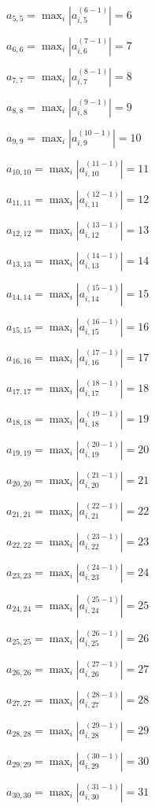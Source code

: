 \documentclass[a4paper,12pt]{article}
\begin{document}
$a _{ 5, 5 } =  \max _i |a _{ i, 5 } ^{ (6 - 1) } | = 6$

$a _{ 6, 6 } =  \max _i |a _{ i, 6 } ^{ (7 - 1) } | = 7$

$a _{ 7, 7 } =  \max _i |a _{ i, 7 } ^{ (8 - 1) } | = 8$

$a _{ 8, 8 } =  \max _i |a _{ i, 8 } ^{ (9 - 1) } | = 9$

$a _{ 9, 9 } =  \max _i |a _{ i, 9 } ^{ (10 - 1) } | = 10$

$a _{ 10, 10 } =  \max _i |a _{ i, 10 } ^{ (11 - 1) } | = 11$

$a _{ 11, 11 } =  \max _i |a _{ i, 11 } ^{ (12 - 1) } | = 12$

$a _{ 12, 12 } =  \max _i |a _{ i, 12 } ^{ (13 - 1) } | = 13$

$a _{ 13, 13 } =  \max _i |a _{ i, 13 } ^{ (14 - 1) } | = 14$

$a _{ 14, 14 } =  \max _i |a _{ i, 14 } ^{ (15 - 1) } | = 15$

$a _{ 15, 15 } =  \max _i |a _{ i, 15 } ^{ (16 - 1) } | = 16$

$a _{ 16, 16 } =  \max _i |a _{ i, 16 } ^{ (17 - 1) } | = 17$

$a _{ 17, 17 } =  \max _i |a _{ i, 17 } ^{ (18 - 1) } | = 18$

$a _{ 18, 18 } =  \max _i |a _{ i, 18 } ^{ (19 - 1) } | = 19$

$a _{ 19, 19 } =  \max _i |a _{ i, 19 } ^{ (20 - 1) } | = 20$

$a _{ 20, 20 } =  \max _i |a _{ i, 20 } ^{ (21 - 1) } | = 21$

$a _{ 21, 21 } =  \max _i |a _{ i, 21 } ^{ (22 - 1) } | = 22$

$a _{ 22, 22 } =  \max _i |a _{ i, 22 } ^{ (23 - 1) } | = 23$

$a _{ 23, 23 } =  \max _i |a _{ i, 23 } ^{ (24 - 1) } | = 24$

$a _{ 24, 24 } =  \max _i |a _{ i, 24 } ^{ (25 - 1) } | = 25$

$a _{ 25, 25 } =  \max _i |a _{ i, 25 } ^{ (26 - 1) } | = 26$

$a _{ 26, 26 } =  \max _i |a _{ i, 26 } ^{ (27 - 1) } | = 27$

$a _{ 27, 27 } =  \max _i |a _{ i, 27 } ^{ (28 - 1) } | = 28$

$a _{ 28, 28 } =  \max _i |a _{ i, 28 } ^{ (29 - 1) } | = 29$

$a _{ 29, 29 } =  \max _i |a _{ i, 29 } ^{ (30 - 1) } | = 30$

$a _{ 30, 30 } =  \max _i |a _{ i, 30 } ^{ (31 - 1) } | = 31$
\end{document}
